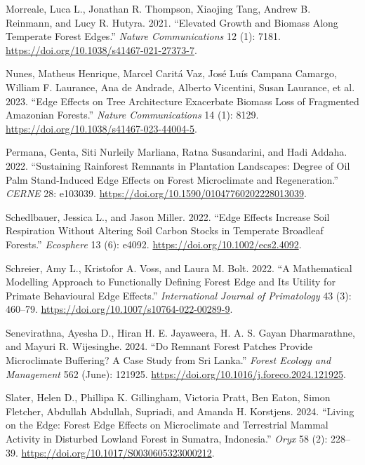 \documentclass[
  12pt,
]{article}
\newlength{\cslhangindent}
\newenvironment{CSLReferences}[2] %
 {\begin{list}{}{%
  \setlength{\itemindent}{0pt}
  \setlength{\leftmargin}{0pt}
  \setlength{\parsep}{0pt}
  \ifodd #1
   \setlength{\leftmargin}{\cslhangindent}
   \setlength{\itemindent}{-1\cslhangindent}
  \fi
  \setlength{\itemsep}{#2\baselineskip}}}
 {\end{list}}
\begin{document}
\begin{CSLReferences}{1}{0}
Morreale, Luca L., Jonathan R. Thompson, Xiaojing Tang, Andrew B.
Reinmann, and Lucy R. Hutyra. 2021. {``Elevated Growth and Biomass Along
Temperate Forest Edges.''} \emph{Nature Communications} 12 (1): 7181.
\url{https://doi.org/10.1038/s41467-021-27373-7}.

Nunes, Matheus Henrique, Marcel Caritá Vaz, José Luís Campana Camargo,
William F. Laurance, Ana de Andrade, Alberto Vicentini, Susan Laurance,
et al. 2023. {``Edge Effects on Tree Architecture Exacerbate Biomass
Loss of Fragmented {Amazonian} Forests.''} \emph{Nature Communications}
14 (1): 8129. \url{https://doi.org/10.1038/s41467-023-44004-5}.

Permana, Genta, Siti Nurleily Marliana, Ratna Susandarini, and Hadi
Addaha. 2022. {``Sustaining Rainforest Remnants in Plantation
Landscapes: Degree of Oil Palm Stand-Induced Edge Effects on Forest
Microclimate and Regeneration.''} \emph{CERNE} 28: e103039.
\url{https://doi.org/10.1590/01047760202228013039}.

Schedlbauer, Jessica L., and Jason Miller. 2022. {``Edge Effects
Increase Soil Respiration Without Altering Soil Carbon Stocks in
Temperate Broadleaf Forests.''} \emph{Ecosphere} 13 (6): e4092.
\url{https://doi.org/10.1002/ecs2.4092}.

Schreier, Amy L., Kristofor A. Voss, and Laura M. Bolt. 2022. {``A
{Mathematical} {Modelling} {Approach} to {Functionally} {Defining}
{Forest} {Edge} and {Its} {Utility} for {Primate} {Behavioural} {Edge}
{Effects}.''} \emph{International Journal of Primatology} 43 (3):
460--79. \url{https://doi.org/10.1007/s10764-022-00289-9}.

Senevirathna, Ayesha D., Hiran H. E. Jayaweera, H. A. S. Gayan
Dharmarathne, and Mayuri R. Wijesinghe. 2024. {``Do Remnant Forest
Patches Provide Microclimate Buffering? {A} Case Study from {Sri}
{Lanka}.''} \emph{Forest Ecology and Management} 562 (June): 121925.
\url{https://doi.org/10.1016/j.foreco.2024.121925}.

Slater, Helen D., Phillipa K. Gillingham, Victoria Pratt, Ben Eaton,
Simon Fletcher, Abdullah Abdullah, Supriadi, and Amanda H. Korstjens.
2024. {``Living on the Edge: Forest Edge Effects on Microclimate and
Terrestrial Mammal Activity in Disturbed Lowland Forest in {Sumatra},
{Indonesia}.''} \emph{Oryx} 58 (2): 228--39.
\url{https://doi.org/10.1017/S0030605323000212}.


\end{CSLReferences}
\end{document}
